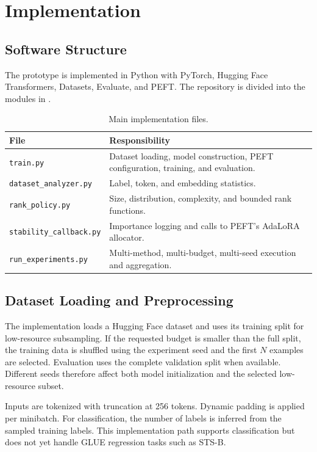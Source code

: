 \chapter{Implementation}
\label{chap:implementation}

\section{Software Structure}

The prototype is implemented in Python with PyTorch, Hugging Face Transformers, Datasets,
Evaluate, and PEFT. The repository is divided into the modules in .

\begin{table}[H]
\centering
\caption{Main implementation files.}
\label{tab:software-files}
\begin{tabularx}{\textwidth}{@{}lX@{}}
\toprule
File & Responsibility \\
\midrule
\texttt{train.py} & Dataset loading, model construction, PEFT configuration, training, and evaluation.\\
\texttt{dataset\_analyzer.py} & Label, token, and embedding statistics.\\
\texttt{rank\_policy.py} & Size, distribution, complexity, and bounded rank functions.\\
\texttt{stability\_callback.py} & Importance logging and calls to PEFT's AdaLoRA allocator.\\
\texttt{run\_experiments.py} & Multi-method, multi-budget, multi-seed execution and aggregation.\\
\bottomrule
\end{tabularx}
\end{table}

\section{Dataset Loading and Preprocessing}

The implementation loads a Hugging Face dataset and uses its training split for low-resource
subsampling. If the requested budget is smaller than the full split, the training data is shuffled
using the experiment seed and the first $N$ examples are selected. Evaluation uses the complete
validation split when available. Different seeds therefore affect both model initialization and
the selected low-resource subset.

Inputs are tokenized with truncation at 256 tokens. Dynamic padding is applied per minibatch.
For classification, the number of labels is inferred from the sampled training labels. This
implementation path supports classification but does not yet handle GLUE regression tasks such as
STS-B.

